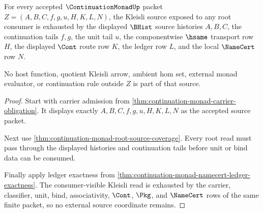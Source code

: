 \begin{theorem}
\label{thm:continuation-monad-root-kleisli-source-totality}
For every accepted $\ContinuationMonadUp$ packet $Z=(A,B,C,f,g,u,H,K,L,N)$, the Kleisli source exposed to any root consumer is exhausted by the displayed $\BHist$ source histories $A,B,C$, the continuation tails $f,g$, the unit tail $u$, the componentwise $\hsame$ transport row $H$, the displayed $\Cont$ route row $K$, the ledger row $L$, and the local $\NameCert$ row $N$.

No host function, quotient Kleisli arrow, ambient hom set, external monad evaluator, or continuation rule outside $Z$ is part of that source.
\end{theorem}
\begin{proof}
Start with carrier admission from \autoref{thm:continuation-monad-carrier-obligation}. It displays exactly $A,B,C,f,g,u,H,K,L,N$ as the accepted source packet.

Next use \autoref{thm:continuation-monad-root-source-coverage}. Every root read must pass through the displayed histories and continuation tails before unit or bind data can be consumed.

Finally apply ledger exactness from \autoref{thm:continuation-monad-namecert-ledger-exactness}. The consumer-visible Kleisli read is exhausted by the carrier, classifier, unit, bind, associativity, $\Cont$, $\Pkg$, and $\NameCert$ rows of the same finite packet, so no external source coordinate remains.
\end{proof}

